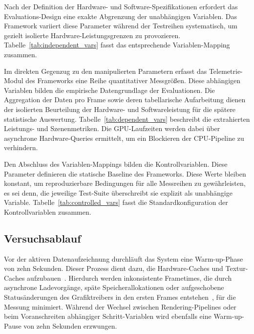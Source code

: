 Nach der Definition der Hardware- und Software-Spezifikationen erfordert das Evaluations-Design eine exakte Abgrenzung
der unabhängigen Variablen.
Das Framework variiert diese Parameter während der Testreihen systematisch, um gezielt isolierte
Hardware-Leistungsgrenzen zu provozieren.
Tabelle~\ref{tab:independent_vars} fasst das entsprechende Variablen-Mapping zusammen.

Im direkten Gegenzug zu den manipulierten Parametern erfasst das Telemetrie-Modul des Frameworks eine Reihe
quantitativer Messgrößen.
Diese abhängigen Variablen bilden die empirische Datengrundlage der Evaluationen.
Die Aggregation der Daten pro Frame sowie deren tabellarische Aufarbeitung dienen der isolierten Beurteilung der
Hardware- und Softwareleistung für die spätere statistische Auswertung.
Tabelle~\ref{tab:dependent_vars} beschreibt die extrahierten Leistungs- und Szenenmetriken.
Die \ac{GPU}-Laufzeiten werden dabei über asynchrone Hardware-Queries ermittelt, um ein Blockieren der \ac{CPU}-Pipeline
zu verhindern.

Den Abschluss des Variablen-Mappings bilden die Kontrollvariablen.
Diese Parameter definieren die statische Baseline des Frameworks.
Diese Werte bleiben konstant, um reproduzierbare Bedingungen für alle Messreihen zu gewährleisten, es sei denn, die
jeweilige Test-Suite überschreibt sie explizit als unabhängige Variable.
Tabelle~\ref{tab:controlled_vars} fasst die Standardkonfiguration der Kontrollvariablen zusammen.

\subsection{{Versuchsablauf}}
\label{subsec:050103_evaluateion_procedure}

Vor der aktiven Datenaufzeichnung durchläuft das System eine Warm-up-Phase von zehn Sekunden.
Dieser Prozess dient dazu, die Hardware-Caches und Textur-Caches
aufzubauen~\parencites(vgl.)()[Kap.~18.4, Abschn.~\textit{Memory Issues}]{akenine-mollerRealtimeRendering2019}
[]{NVIDIATuringArchitectureWhitepaper}.
Hierdurch werden inkonsistente Frametimes, die durch asynchrone Ladevorgänge, späte Speicherallokationen oder
aufgeschobene Statusänderungen des Grafiktreibers in den ersten Frames
entstehen~\parencite[vgl.][Kap.~18.4.2, Abschn.~\textit{State Changes}]{akenine-mollerRealtimeRendering2019},
für die Messung minimiert.
Während der Wechsel zwischen Rendering-Pipelines oder beim Voranschreiten abhängiger Schritt-Variablen wird ebenfalls
eine Warm-up-Pause von zehn Sekunden erzwungen.



